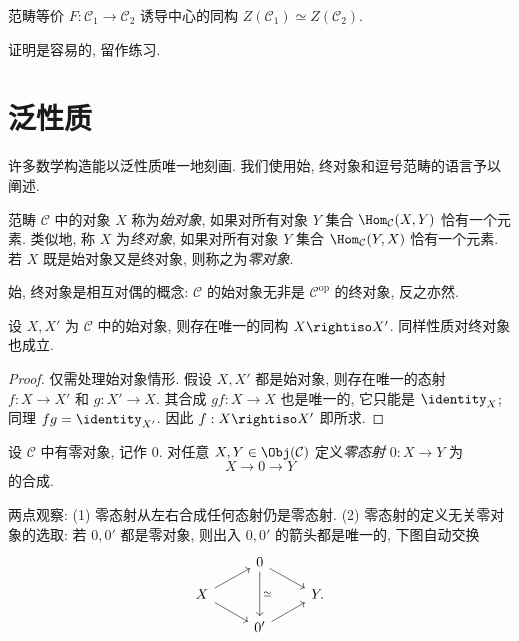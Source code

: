 \begin{proposition}
	范畴等价 $F: \mathcal{C}_1 \to \mathcal{C}_2$ 诱导中心的同构 $Z(\mathcal{C}_1) \simeq Z(\mathcal{C}_2)$.
\end{proposition}
证明是容易的, 留作练习.

\section{泛性质}\label{sec:cat-universals}
许多数学构造能以泛性质唯一地刻画. 我们使用始, 终对象和逗号范畴的语言予以阐述.

\begin{definition}\label{def:universal-objects}
	范畴 $\mathcal{C}$ 中的对象 $X$ 称为\emph{始对象}, 如果对所有对象 $Y$ 集合 $\Hom_{\mathcal{C}}(X, Y)$ 恰有一个元素. 类似地, 称 $X$ 为\emph{终对象}, 如果对所有对象 $Y$ 集合 $\Hom_{\mathcal{C}}(Y, X)$ 恰有一个元素. 若 $X$ 既是始对象又是终对象, 则称之为\emph{零对象}.
\end{definition}

始, 终对象是相互对偶的概念: $\mathcal{C}$ 的始对象无非是 $\mathcal{C}^\text{op}$ 的终对象, 反之亦然.

\begin{proposition}\label{prop:initial-obj-uniqueness}
	设 $X, X'$ 为 $\mathcal{C}$ 中的始对象, 则存在唯一的同构 $X \rightiso X'$. 同样性质对终对象也成立.
\end{proposition}
\begin{proof}
	仅需处理始对象情形. 假设 $X, X'$ 都是始对象, 则存在唯一的态射 $f: X \to X'$ 和 $g: X' \to X$. 其合成 $gf: X \to X$ 也是唯一的, 它只能是 $\identity_X$; 同理 $fg = \identity_{X'}$. 因此 $f: X \rightiso X'$ 即所求.
\end{proof}

\begin{definition}\label{def:zero-morphism}
	设 $\mathcal{C}$ 中有零对象, 记作 $0$. 对任意 $X, Y \in \Obj(\mathcal{C})$ 定义\emph{零态射} $0: X \to Y$ 为
	\[ X \to 0 \to Y \]
	的合成.
\end{definition}

两点观察: (1) 零态射从左右合成任何态射仍是零态射. (2) 零态射的定义无关零对象的选取: 若 $0, 0'$ 都是零对象, 则出入 $0, 0'$ 的箭头都是唯一的, 下图自动交换
\[ \begin{tikzcd}[row sep=small]
	{} & 0 \arrow[rd] \arrow[dd, "\simeq"] & {} \\
	X \arrow[ru] \arrow[rd] & & Y . \\
	& 0' \arrow[ru] &
\end{tikzcd} \]

